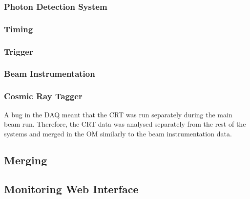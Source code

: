 \subsubsection*{Photon Detection System}

\subsubsection*{Timing}

\subsubsection*{Trigger}

\subsubsection*{Beam Instrumentation}

\subsubsection*{Cosmic Ray Tagger}
A bug in the DAQ meant that the CRT was run separately during the main beam 
run. Therefore, the CRT data was analysed separately from the rest of the 
\protodune{} systems and merged in the OM similarly to the beam 
instrumentation data.

\subsection{Merging}


\subsection{Monitoring Web Interface}
